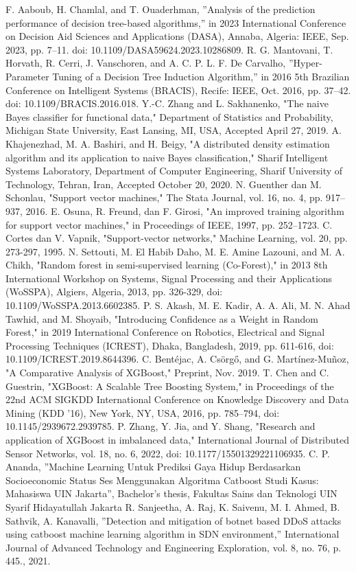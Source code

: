 \documentclass[conference]{IEEEtran}
\begin{document}
\begin{thebibliography}{00}
 F. Aaboub, H. Chamlal, and T. Ouaderhman, ''Analysis of the prediction performance of decision tree-based algorithms,'' in 2023 International Conference on Decision Aid Sciences and Applications (DASA), Annaba, Algeria: IEEE, Sep. 2023, pp. 7--11. doi: 10.1109/DASA59624.2023.10286809.
 R. G. Mantovani, T. Horvath, R. Cerri, J. Vanschoren, and A. C. P. L. F. De Carvalho, ''Hyper-Parameter Tuning of a Decision Tree Induction Algorithm,'' in 2016 5th Brazilian Conference on Intelligent Systems (BRACIS), Recife: IEEE, Oct. 2016, pp. 37--42. doi: 10.1109/BRACIS.2016.018.
 Y.-C. Zhang and L. Sakhanenko, "The naive Bayes classifier for functional data," Department of Statistics and Probability, Michigan State University, East Lansing, MI, USA, Accepted April 27, 2019.
 A. Khajenezhad, M. A. Bashiri, and H. Beigy, "A distributed density estimation algorithm and its application to naive Bayes classification," Sharif Intelligent Systems Laboratory, Department of Computer Engineering, Sharif University of Technology, Tehran, Iran, Accepted October 20, 2020.
 N. Guenther dan M. Schonlau, "Support vector machines," The Stata Journal, vol. 16, no. 4, pp. 917--937, 2016.
 E. Osuna, R. Freund, dan F. Girosi, "An improved training algorithm for support vector machines," in Proceedings of IEEE, 1997, pp. 252--1723.
 C. Cortes dan V. Vapnik, "Support-vector networks," Machine Learning, vol. 20, pp. 273-297, 1995.
 N. Settouti, M. El Habib Daho, M. E. Amine Lazouni, and M. A. Chikh, "Random forest in semi-supervised learning (Co-Forest)," in 2013 8th International Workshop on Systems, Signal Processing and their Applications (WoSSPA), Algiers, Algeria, 2013, pp. 326-329, doi: 10.1109/WoSSPA.2013.6602385.
 P. S. Akash, M. E. Kadir, A. A. Ali, M. N. Ahad Tawhid, and M. Shoyaib, "Introducing Confidence as a Weight in Random Forest," in 2019 International Conference on Robotics, Electrical and Signal Processing Techniques (ICREST), Dhaka, Bangladesh, 2019, pp. 611-616, doi: 10.1109/ICREST.2019.8644396.
 C. Bentéjac, A. Csörgő, and G. Martínez-Muñoz, "A Comparative Analysis of XGBoost," Preprint, Nov. 2019.
 T. Chen and C. Guestrin, "XGBoost: A Scalable Tree Boosting System," in Proceedings of the 22nd ACM SIGKDD International Conference on Knowledge Discovery and Data Mining (KDD '16), New York, NY, USA, 2016, pp. 785–794, doi: 10.1145/2939672.2939785.
 P. Zhang, Y. Jia, and Y. Shang, "Research and application of XGBoost in imbalanced data," International Journal of Distributed Sensor Networks, vol. 18, no. 6, 2022, doi: 10.1177/15501329221106935.
 C. P. Ananda, ''Machine Learning Untuk Prediksi Gaya Hidup Berdasarkan Socioeconomic Status Ses Menggunakan Algoritma Catboost Studi Kasus: Mahasiswa UIN Jakarta'', Bachelor's thesis, Fakultas Sains dan Teknologi UIN Syarif Hidayatullah Jakarta
 R. Sanjeetha, A. Raj, K. Saivenu, M. I. Ahmed, B. Sathvik, A. Kanavalli, ''Detection and mitigation of botnet based DDoS attacks using catboost machine learning algorithm in SDN environment,'' International Journal of Advanced Technology and Engineering Exploration, vol. 8, no. 76, p. 445., 2021.


\end{thebibliography}
\end{document}
